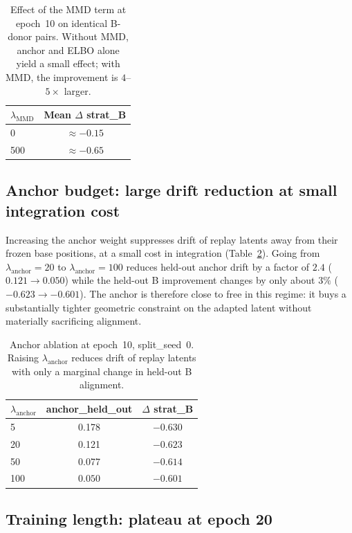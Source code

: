 \documentclass[12pt, a4paper]{article}
\begin{document}
\begin{table}[H]
\centering
\caption{Effect of the MMD term at epoch~10 on identical B-donor pairs.
Without MMD, anchor and ELBO alone yield a small effect; with MMD, the
improvement is \(4\)--\(5\times\) larger.}
\label{tab:mmd-vs-nommd}
\begin{tabular}{lc}
\toprule
\(\lambda_{\text{MMD}}\) & Mean \(\Delta\) strat\_B \\
\midrule
0   & \(\approx -0.15\) \\
500 & \(\approx -0.65\) \\
\bottomrule
\end{tabular}
\end{table}


\subsection{Anchor budget: large drift reduction at small integration cost}

Increasing the anchor weight suppresses drift of replay latents away from
their frozen base positions, at a small cost in integration
(Table~\ref{tab:anchor-abl}). Going from
\(\lambda_{\text{anchor}}=20\) to \(\lambda_{\text{anchor}}=100\)
reduces held-out anchor drift by a factor of \(2.4\)
(\(0.121 \to 0.050\)) while the held-out B improvement changes by only
about \(3\%\) (\(-0.623 \to -0.601\)). The anchor is therefore close to
free in this regime: it buys a substantially tighter geometric
constraint on the adapted latent without materially sacrificing
alignment.

\begin{table}[H]
\centering
\caption{Anchor ablation at epoch~10, split\_seed~0. Raising
\(\lambda_{\text{anchor}}\) reduces drift of replay latents with only a
marginal change in held-out B alignment.}
\label{tab:anchor-abl}
\begin{tabular}{lcc}
\toprule
\(\lambda_{\text{anchor}}\) & anchor\_held\_out & \(\Delta\) strat\_B \\
\midrule
5   & 0.178 & \(-0.630\) \\
20  & 0.121 & \(-0.623\) \\
50  & 0.077 & \(-0.614\) \\
100 & \(\mathbf{0.050}\) & \(\mathbf{-0.601}\) \\
\bottomrule
\end{tabular}
\end{table}


\subsection{Training length: plateau at epoch 20}
\end{document}
